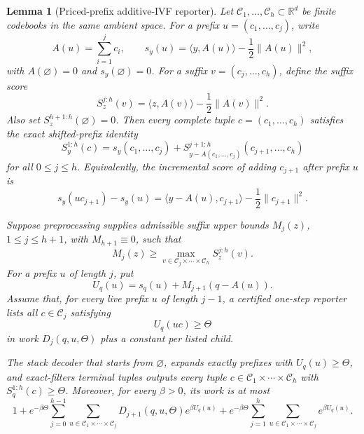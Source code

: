 \documentclass[10pt]{article}
\newtheorem{lemma}[theorem]{Lemma}
\theoremstyle{definition}
\newcommand{\ip}[2]{\langle #1,#2\rangle}
\begin{document}
\begin{lemma}[Priced-prefix additive-IVF reporter]
   \label{lem:priced-prefix-additive-ivf-reporter}
   Let \(\mathcal C_1,\ldots,\mathcal C_h\subset\mathbb R^d\) be finite
   codebooks in the same ambient space.  For a prefix
   \(u=(c_1,\ldots,c_j)\), write
   \[
      A(u)=\sum_{i=1}^j c_i,
      \qquad
      s_y(u)=\ip{y}{A(u)}-\frac12\|A(u)\|^2,
   \]
   with \(A(\varnothing)=0\) and \(s_y(\varnothing)=0\).  For a suffix
   \(v=(c_j,\ldots,c_h)\), define the suffix score
   \[
      S_z^{j:h}(v)=\ip{z}{A(v)}-\frac12\|A(v)\|^2 .
   \]
   Also set \(S_z^{h+1:h}(\varnothing)=0\).
   Then every complete tuple \(c=(c_1,\ldots,c_h)\) satisfies the exact
   shifted-prefix identity
   \[
      S_y^{1:h}(c)
      =
      s_y(c_1,\ldots,c_j)
      +
      S_{y-A(c_1,\ldots,c_j)}^{j+1:h}(c_{j+1},\ldots,c_h)
      \tag{PFX0}
   \]
   for all \(0\le j\le h\).  Equivalently, the incremental score of adding
   \(c_{j+1}\) after prefix \(u\) is
   \[
      s_y(uc_{j+1})-s_y(u)
      =
      \ip{y-A(u)}{c_{j+1}}-\frac12\|c_{j+1}\|^2 .
      \tag{PFX1}
   \]

   Suppose preprocessing supplies admissible suffix upper bounds
   \(M_j(z)\), \(1\le j\le h+1\), with \(M_{h+1}\equiv0\), such that
   \[
      M_j(z)\ge
      \max_{v\in\mathcal C_j\times\cdots\times\mathcal C_h}
      S_z^{j:h}(v).
      \tag{PFX2}
   \]
   For a prefix \(u\) of length \(j\), put
   \[
      U_q(u)=s_q(u)+M_{j+1}(q-A(u)).
      \tag{PFX3}
   \]
   Assume that, for every live prefix \(u\) of length \(j-1\), a certified
   one-step reporter lists all \(c\in\mathcal C_j\) satisfying
   \[
      U_q(uc)\ge\Theta
      \tag{PFX4}
   \]
   in work \(D_j(q,u,\Theta)\) plus a constant per listed child.

   The stack decoder that starts from \(\varnothing\), expands exactly prefixes
   with \(U_q(u)\ge\Theta\), and exact-filters terminal tuples outputs every
   tuple \(c\in\mathcal C_1\times\cdots\times\mathcal C_h\) with
   \(S_q^{1:h}(c)\ge\Theta\).  Moreover, for every \(\beta>0\), its work is at
   most
   \[
      1+
      e^{-\beta\Theta}
      \sum_{j=0}^{h-1}
      \sum_{u\in\mathcal C_1\times\cdots\times\mathcal C_j}
      D_{j+1}(q,u,\Theta)e^{\beta U_q(u)}
      +
      e^{-\beta\Theta}
      \sum_{j=1}^h
      \sum_{u\in\mathcal C_1\times\cdots\times\mathcal C_j}
      e^{\beta U_q(u)} .
      \tag{PFX5}
   \]
\end{lemma}
\end{document}
